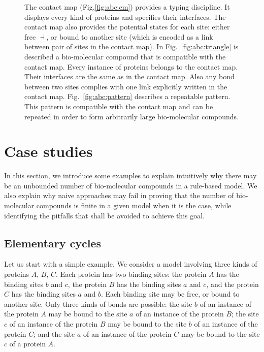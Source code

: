 \documentclass{entcs}
\newcommand{\freesymbol}{\dashv}
\begin{document}
\begin{figure}
{The contact map  (Fig.\ref{fig:abc:cm}) provides a typing discipline.
It displays every kind of proteins and specifies their interfaces.
The contact map also provides the potential states for each site:
either free $\freesymbol$, or bound to another site (which is encoded as a link between pair of sites in the contact map).
In Fig.~\ref{fig:abc:triangle} is described a bio-molecular compound that is compatible with the contact map. Every instance of proteins belongs to the contact map. Their interfaces are the same as in the contact map.
Also any bond between two sites complies with one link explicitly written in the contact map.
Fig.~\ref{fig:abc:pattern} describes a repeatable pattern.
This pattern is compatible with the contact map and can be repeated in order to form arbitrarily large bio-molecular compounds.
}\label{fig:abc}
\end{figure}
\section{Case studies}
\label{sec:case-study}

In this section, we introduce some examples to explain intuitively why there may be an unbounded number of bio-molecular compounds in a rule-based model.  We also explain why naive approaches may fail in proving that the number of bio-molecular compounds is finite in a given model when it is the case,  while identifying the pitfalls that shall be avoided to achieve this goal.

\subsection{Elementary cycles}

\label{sec:triangle}

Let us start with a simple example. We consider a model involving three kinds of proteins $A$, $B$, $C$. Each protein has two binding sites: the protein $A$ has the binding sites $b$ and $c$, the protein $B$ has the binding sites $a$ and $c$, and the protein $C$ has the binding sites $a$ and $b$. Each binding site may be free, or bound to another site. Only three kinds of bonds are possible: the site $b$ of an instance of the protein $A$ may be bound to the site $a$ of an instance of the protein $B$; the site $c$ of an instance of the  protein $B$ may be bound to the site $b$ of an instance of the protein $C$; and the site $a$ of an instance of the protein $C$ may be bound to the site $c$ of a protein $A$.
\end{document}
